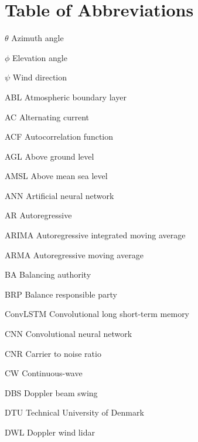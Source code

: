 \chapter{Table of Abbreviations}
\label{sec:abbreviations}


\makeatletter
\newcommand{\tocfill}{\cleaders\hbox{$\m@th \mkern\@dotsep mu . \mkern\@dotsep mu$}\hfill}
\makeatother
\newcommand{\abbrlabel}[1]{\makebox[3cm][l]{\textbf{#1}\ \tocfill}}
\newenvironment{abbreviations}{\begin{list}{}{\renewcommand{\makelabel}{\abbrlabel}%
    \setlength{\labelwidth}{3cm}\setlength{\leftmargin}{\labelwidth+\labelsep}%
        \setlength{\itemsep}{0pt}}}{\end{list}}
\noindent
\bigskip
\begin{abbreviations}
\item[$\theta$] Azimuth angle
\item[$\phi$] Elevation angle
\item[$\psi$] Wind direction

\item[ABL] Atmospheric boundary layer
\item[AC] Alternating current
\item[ACF] Autocorrelation function
\item[AGL] Above ground level
\item[AMSL] Above mean sea level
\item[ANN] Artificial neural network
\item[AR] Autoregressive
\item[ARIMA] Autoregressive integrated moving average
\item[ARMA] Autoregressive moving average

\item[BA] Balancing authority
\item[BRP] Balance responsible party

\item[ConvLSTM] Convolutional long short-term memory
\item[CNN] Convolutional neural network
\item[CNR] Carrier to noise ratio
\item[CW] Continuous-wave

\item[DBS] Doppler beam swing
\item[DTU] Technical University of Denmark
\item[DWL] Doppler wind lidar


\end{abbreviations}
